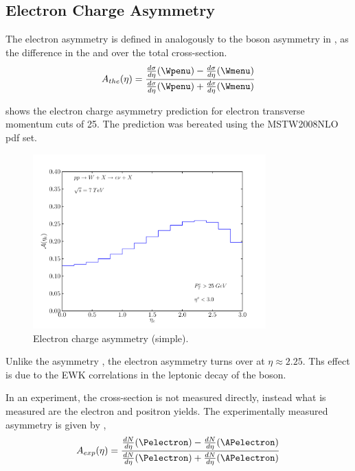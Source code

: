 \subsection{Electron Charge Asymmetry}

The electron asymmetry is defined in  analogously to the
\PW boson asymmetry in , as the difference in the
\HepProcess{\PWplus \to \APelectron} and \HepProcess{\PWminus \to \Pelectron}
over the total \inclusiveWe cross-section.
\begin{equation}
A_{the}(\eta)=\frac{  \frac{d\sigma}{d\eta}(\Wpenu) -
\frac{d\sigma}{d\eta}(\Wmenu) }{ \frac{d\sigma}{d\eta}(\Wpenu) +
\frac{d\sigma}{d\eta}(\Wmenu) }
\label{eq:AsymThe}
\end{equation} 

 shows the electron charge asymmetry prediction for
electron transverse momentum cuts of \unit{25}{\GeV}. The prediction was
bereated using the MSTW2008NLO \ac{pdf}\cite{mstw} set.

\begin{figure}[htbp]
  \centering
  \includegraphics[width=0.8\textwidth]{lepton-asym}
  \caption{Electron charge asymmetry (simple).}
  \label{wbos:asym_simple}
\end{figure}

Unlike the \PW asymmetry , the electron asymmetry turns over at $\eta\approx
2.25$. Ths effect is due to the \ac{EWK} correlations in the leptonic decay of
the \PW boson.

In an experiment, the cross-section is not measured directly, instead what is
measured are the electron and positron yields.  The experimentally measured
asymmetry is given by ,
\begin{equation}
A_{exp}(\eta)=\frac{  \frac{dN}{d\eta}(\Pelectron) -
\frac{dN}{d\eta}(\APelectron) }{ \frac{dN}{d\eta}(\Pelectron) +
\frac{dN}{d\eta}(\APelectron) }
\label{eq:AsymExp}
\end{equation} 

